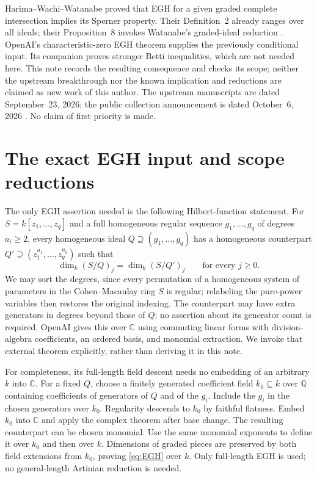 \documentclass[11pt]{article}
\begin{document}
Harima--Wachi--Watanabe \cite[Theorem~11]{HWW} proved that EGH for a
given graded complete intersection implies its Sperner property. Their
Definition~2 already ranges over all ideals; their Proposition~8 invokes
Watanabe's graded-ideal reduction \cite[Lemma~2.4]{Watanabe}.
OpenAI's characteristic-zero EGH theorem \cite[Corollary~1.3]{OAI:EGH}
supplies the previously conditional input. Its companion
\cite[Theorem~1.1 and Corollary~1.2]{OAI:LPP} proves stronger Betti
inequalities, which are not needed here.
This note records the resulting consequence and checks its scope;
neither the upstream breakthrough nor the known implication and
reductions are claimed as new work of this author.
The upstream manuscripts are dated September~23, 2026; the public
collection announcement is dated October~6, 2026 \cite{Release}.
No claim of first priority is made.

\section{The exact EGH input and scope reductions}
The only EGH assertion needed is the following Hilbert-function statement.
For \(S=k[z_1,\ldots,z_q]\) and a full homogeneous regular sequence
\(g_1,\ldots,g_q\) of degrees \(a_i\ge2\), every homogeneous ideal
\(Q\supseteq(g_1,\ldots,g_q)\) has a homogeneous counterpart
\(Q'\supseteq(z_1^{a_1},\ldots,z_q^{a_q})\) such that
\begin{equation}\label{eq:EGH}
\dim_k(S/Q)_j=\dim_k(S/Q')_j\qquad\text{for every }j\ge0.
\end{equation}
We may sort the degrees, since every permutation of a homogeneous system
of parameters in the Cohen--Macaulay ring \(S\) is regular; relabeling
the pure-power variables then restores the original indexing.
The counterpart may have extra generators in degrees beyond those of
\(Q\); no assertion about its generator count is required.
OpenAI \cite[Theorem~1.1 and Corollary~1.2]{OAI:EGH} gives this over
\(\mathbb C\) using commuting linear forms with division-algebra
coefficients, an ordered basis, and monomial extraction. We invoke that
external theorem explicitly, rather than deriving it in this note.

For completeness, its full-length field descent needs no embedding of
an arbitrary \(k\) into \(\mathbb C\). For a fixed \(Q\), choose a
finitely generated coefficient field \(k_0\subseteq k\) over
\(\mathbb Q\) containing coefficients of generators of \(Q\) and of
the \(g_i\). Include the \(g_i\) in the chosen generators over \(k_0\).
Regularity descends to \(k_0\) by faithful flatness. Embed \(k_0\) into
\(\mathbb C\) and apply the complex theorem after base change.
The resulting counterpart can be chosen monomial. Use the same monomial
exponents to define it over \(k_0\) and then over \(k\).
Dimensions of graded pieces are preserved by both field extensions from
\(k_0\), proving \eqref{eq:EGH} over \(k\).
Only full-length EGH is used; no general-length Artinian reduction is
needed.
\end{document}
